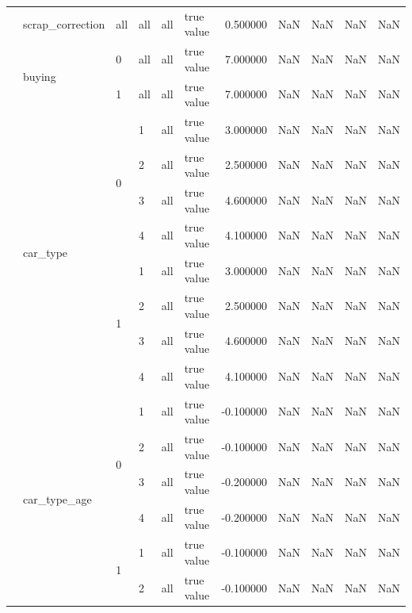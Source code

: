 \begin{tabular}{llllllrrrrr}
\cline{2-11} \cline{3-11} \cline{4-11} \cline{5-11}
 & scrap_correction & all & all & all & true value & 0.500000 & NaN & NaN & NaN & NaN \\
\cline{2-11} \cline{3-11} \cline{4-11} \cline{5-11}
 & \multirow[t]{2}{*}{buying} & 0 & all & all & true value & 7.000000 & NaN & NaN & NaN & NaN \\
\cline{3-11} \cline{4-11} \cline{5-11}
 &  & 1 & all & all & true value & 7.000000 & NaN & NaN & NaN & NaN \\
\cline{2-11} \cline{3-11} \cline{4-11} \cline{5-11}
 & \multirow[t]{8}{*}{car_type} & \multirow[t]{4}{*}{0} & 1 & all & true value & 3.000000 & NaN & NaN & NaN & NaN \\
\cline{4-11} \cline{5-11}
 &  &  & 2 & all & true value & 2.500000 & NaN & NaN & NaN & NaN \\
\cline{4-11} \cline{5-11}
 &  &  & 3 & all & true value & 4.600000 & NaN & NaN & NaN & NaN \\
\cline{4-11} \cline{5-11}
 &  &  & 4 & all & true value & 4.100000 & NaN & NaN & NaN & NaN \\
\cline{3-11} \cline{4-11} \cline{5-11}
 &  & \multirow[t]{4}{*}{1} & 1 & all & true value & 3.000000 & NaN & NaN & NaN & NaN \\
\cline{4-11} \cline{5-11}
 &  &  & 2 & all & true value & 2.500000 & NaN & NaN & NaN & NaN \\
\cline{4-11} \cline{5-11}
 &  &  & 3 & all & true value & 4.600000 & NaN & NaN & NaN & NaN \\
\cline{4-11} \cline{5-11}
 &  &  & 4 & all & true value & 4.100000 & NaN & NaN & NaN & NaN \\
\cline{2-11} \cline{3-11} \cline{4-11} \cline{5-11}
 & \multirow[t]{8}{*}{car_type_age} & \multirow[t]{4}{*}{0} & 1 & all & true value & -0.100000 & NaN & NaN & NaN & NaN \\
\cline{4-11} \cline{5-11}
 &  &  & 2 & all & true value & -0.100000 & NaN & NaN & NaN & NaN \\
\cline{4-11} \cline{5-11}
 &  &  & 3 & all & true value & -0.200000 & NaN & NaN & NaN & NaN \\
\cline{4-11} \cline{5-11}
 &  &  & 4 & all & true value & -0.200000 & NaN & NaN & NaN & NaN \\
\cline{3-11} \cline{4-11} \cline{5-11}
 &  & \multirow[t]{4}{*}{1} & 1 & all & true value & -0.100000 & NaN & NaN & NaN & NaN \\
\cline{4-11} \cline{5-11}
 &  &  & 2 & all & true value & -0.100000 & NaN & NaN & NaN & NaN \\

\end{tabular}
